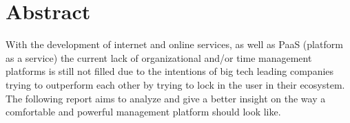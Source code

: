 \section{Abstract}
\par
With the development of internet and online services, as well as PaaS (platform as a service) the current lack of organizational and/or time management platforms is still not filled due to the intentions of big tech leading companies trying to outperform each other by trying to lock in the user in their ecosystem. The following report aims to analyze and give a better insight on the way a comfortable and powerful management platform should look like. 